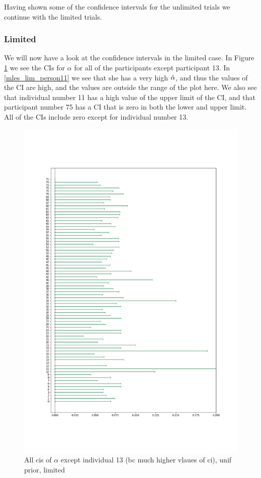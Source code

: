 Having shown some of the confidence intervals for the unlimited trials we continue with the limited trials.












\subsubsection{Limited}
We will now have a look at the confidence intervals in the limited case. In Figure \ref{fig:all_cis_alpha_lim} we see the CIs for $\alpha$ for all of the participants except participant 13. In \eqref{mles_lim_person11} we see that she has a very high $\hat{\alpha}$, and thus the values of the CI are high, and the values are outside the range of the plot here. We also see that individual number 11 has a high value of the upper limit of the CI, and that participant number 75 has a CI that is zero in both the lower and upper limit. All of the CIs include zero except for individual number 13. 

\begin{figure}
    \centering
    \includegraphics[scale=0.37]{pictures/all_cis_lim_alpha.png} %
    \caption{All cis of $\alpha$ except individual 13 (bc much higher vlaues of ci), unif prior, limited}
    \label{fig:all_cis_alpha_lim}
\end{figure}

